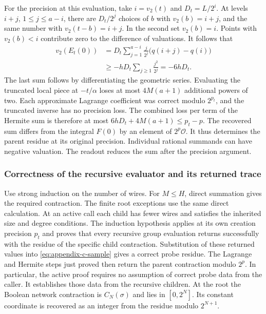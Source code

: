 \documentclass[
  11pt,
]{article}
\begin{document}
For the precision at this evaluation, take \(i=v_2(t)\) and
\(D_t=L/2^i\). At levels \(i+j\), \(1\le j\le a-i\), there
are \(D_t/2^j\) choices of \(b\) with \(v_2(b)=i+j\), and
the same number with \(v_2(t-b)=i+j\). In the second set
\(v_2(b)=i\). Points with \(v_2(b)<i\) contribute zero to
the difference of valuations. It follows that
\[
\begin{aligned}
 v_2(E_t(0))
   &=D_t\sum_{j=1}^{a-i}\frac{j}{2^j}\bigl(q(i+j)-q(i)\bigr)\\
   &\ge -hD_t\sum_{j\ge1}\frac{j^2}{2^j}
    =-6hD_t .
\end{aligned}
\]
The last sum follows by differentiating the geometric series.
Evaluating the truncated local piece at \(-t/\alpha\) loses
at most \(4M(a+1)\) additional powers of two. Each approximate
Lagrange coefficient was correct modulo \(2^{p_t}\), and the
truncated inverse has no precision loss. The combined loss per
term of the Hermite sum is therefore at most
\(6hD_t+4M(a+1)\le p_t-p\).
The recovered sum differs from the integral \(F(0)\) by an
element of \(2^p\mathcal O\). It thus determines the parent
residue at its original precision. Individual rational
summands can have negative valuation. The readout reduces the
sum after the precision argument.

\subsubsection*{Correctness of the recursive evaluator and its returned trace}

Use strong induction on the number of wires. For \(M\le H\),
direct summation gives the required contraction. The finite
root exceptions use the same direct calculation. At an active
call each child has fewer wires and satisfies the inherited
size and degree conditions. The induction hypothesis applies at
its own creation precision \(p_t\) and proves that every
recursive group evaluation returns successfully with the
residue of the specific child contraction. Substitution of
these returned values into \eqref{eq:appendix-c-sample} gives
a correct probe residue. The Lagrange and Hermite steps just
proved then return the parent contraction modulo \(2^p\).
In particular, the active proof requires no assumption of
correct probe data from the caller. It establishes those data
from the recursive children. At the root the Boolean network
contraction is \(C_N(\sigma)\) and lies in \([0,2^N]\).
Its constant coordinate is recovered as an integer from the
residue modulo \(2^{N+1}\).
\end{document}
